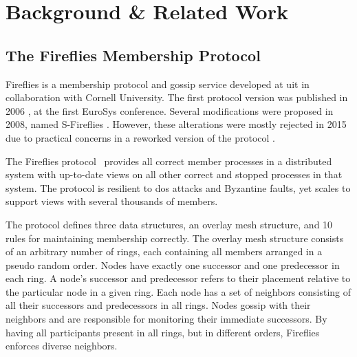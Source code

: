\documentclass[USenglish]{uit-thesis}
\begin{document}


\chapter{Background \& Related Work} \label{chap:back}


\section{The Fireflies Membership Protocol}\label{sec:fireflies}


Fireflies is a membership protocol and gossip service developed at \gls{uit} in collaboration with Cornell University.
The first protocol version was published in 2006 \cite{flies3}, at the first EuroSys conference.
Several modifications were proposed in 2008, named S-Fireflies \cite{s-flies}.
However, these alterations were mostly rejected in 2015 due to practical concerns in a reworked version of the protocol \cite{flies}.


The Fireflies protocol~\cite{flies, flies2} provides all correct member processes in a distributed system with up-to-date views on all other correct and stopped processes in that system. 
The protocol is resilient to \gls{dos} attacks and Byzantine faults, yet scales to support views with several thousands of members.

The protocol defines three data structures, an overlay mesh structure, and 10 rules for maintaining membership correctly. 
The overlay mesh structure consists of an arbitrary number of rings, each containing all members arranged in a pseudo random order.
Nodes have exactly one successor and one predecessor in each ring. 
A node's successor and predecessor refers to their placement relative to the particular node in a given ring.
Each node has a set of neighbors consisting of all their successors and predecessors in all rings. 
Nodes gossip with their neighbors and are responsible for monitoring their immediate successors.
By having all participants present in all rings, but in different orders, Fireflies enforces diverse neighbors. 
\end{document}
